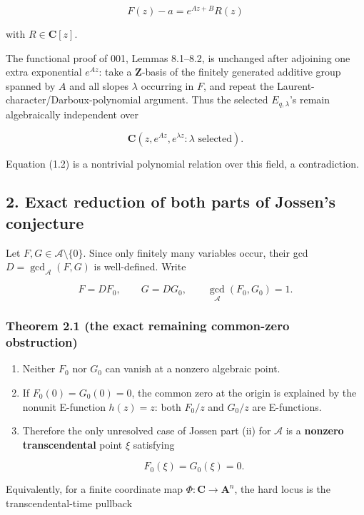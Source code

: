 \[
  F(z)-a=e^{Az+B}R(z)                                      \tag{J-1.2}
\]

with \(R\in\mathbf C[z]\).

The functional proof of 001, Lemmas 8.1--8.2, is unchanged after adjoining
one extra exponential \(e^{Az}\): take a \(\mathbf Z\)-basis of the finitely
generated additive group spanned by \(A\) and all slopes \(\lambda\) occurring
in \(F\), and repeat the Laurent-character/Darboux-polynomial argument.
Thus the selected \(E_{q,\lambda}\)'s remain algebraically independent over

\[
  \mathbf C(z,e^{Az},e^{\lambda z}:\lambda\text{ selected}).
\]

Equation (1.2) is a nontrivial polynomial relation over this field, a
contradiction.

\subsection{2. Exact reduction of both parts of Jossen's conjecture}

Let \(F,G\in\mathscr A\setminus\{0\}\). Since only finitely many variables
occur, their gcd \(D=\gcd_{\mathscr A}(F,G)\) is well-defined. Write

\[
  F=DF_0,\qquad G=DG_0,\qquad \gcd_{\mathscr A}(F_0,G_0)=1.    \tag{J-2.1}
\]

\subsubsection{Theorem 2.1 (the exact remaining common-zero obstruction)}

\begin{enumerate}
\def\labelenumi{\arabic{enumi}.}
\item
  Neither \(F_0\) nor \(G_0\) can vanish at a nonzero algebraic point.
\item
  If \(F_0(0)=G_0(0)=0\), the common zero at the origin is explained by
  the nonunit E-function \(h(z)=z\): both \(F_0/z\) and \(G_0/z\) are
  E-functions.
\item
  Therefore the only unresolved case of Jossen part (ii) for
  \(\mathscr A\) is a \textbf{nonzero transcendental} point \(\xi\) satisfying

  \[
    F_0(\xi)=G_0(\xi)=0.                                  \tag{J-2.2}
  \]
\end{enumerate}

Equivalently, for a finite coordinate map \(\Phi:\mathbf C\to\mathbf A^n\),
the hard locus is the transcendental-time pullback

